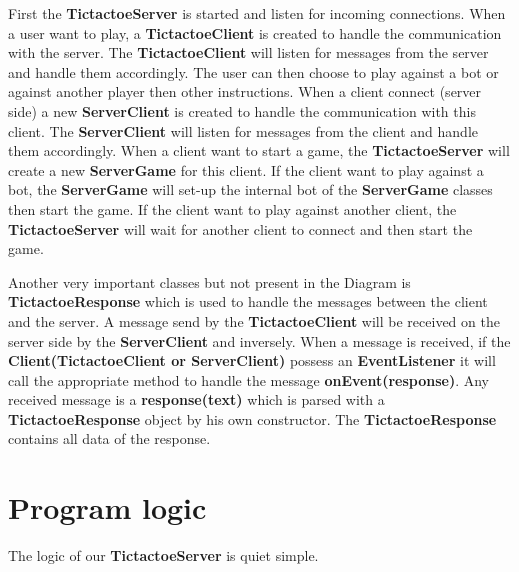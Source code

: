 \documentclass[11pt]{article}
\begin{document}
First the \textbf{TictactoeServer} is started and listen for incoming connections. When a user want to play, 
a \textbf{TictactoeClient} is created to handle the communication with the server.
The \textbf{TictactoeClient} will listen for messages from the server and handle them accordingly.
The user can then choose to play against a bot or against another player then other instructions.
When a client connect (server side) a new \textbf{ServerClient} is created to handle the communication with this client.
The \textbf{ServerClient} will listen for messages from the client and handle them accordingly.
When a client want to start a game, the \textbf{TictactoeServer} will create a new \textbf{ServerGame} for this client.
If the client want to play against a bot, the \textbf{ServerGame} will set-up the internal bot of the \textbf{ServerGame} classes then start the game.
If the client want to play against another client, the \textbf{TictactoeServer} will wait for another client to connect and then start the game.    

\newpage

Another very important classes but not present in the Diagram is \textbf{TictactoeResponse} which is used to handle the messages between the client and the server.
A message send by the \textbf{TictactoeClient} will be received on the server side by the \textbf{ServerClient} and inversely. When a message is received, if the 
\textbf{Client(TictactoeClient or ServerClient)} possess an \textbf{EventListener} it will call the appropriate method to handle the message \textbf{onEvent(response)}.
Any received message is a \textbf{response(text)} which is parsed with a \textbf{TictactoeResponse} object by his own constructor. The \textbf{TictactoeResponse} contains all data of the response.


\section{Program logic}

The logic of our \textbf{TictactoeServer} is quiet simple.
\end{document}

